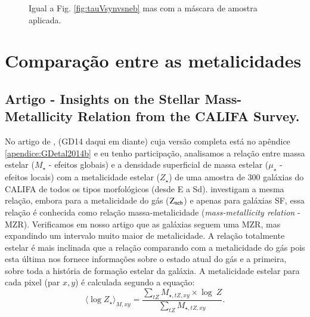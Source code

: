 \begin{figure}
	\centering
	\caption[Comparação entre os coeficientes de extinção (com máscara).]
	{Igual a Fig. \ref{fig:tauVsynvsneb} mas com a máscara de amostra aplicada.} 
	\label{fig:tauVsynvsnebMask}
\end{figure}


\section{Comparação entre as metalicidades}
\label{sec:synvsneb:Z}

\subsection{Artigo - Insights on the Stellar Mass-Metallicity Relation from the CALIFA Survey.}

No artigo de \citet{GonzalezDelgado.etal.2014b}, (GD14 daqui em diante) cuja versão completa está no
apêndice \ref{apendice:GDetal2014b} e eu tenho participação, analisamos a relação entre massa
estelar ($M_\star$ - efeitos globais) e a densidade superficial de massa estelar ($\mu_\star$ -
efeitos locais) com a metalicidade estelar ($Z_\star$) de uma amostra de 300 galáxias do CALIFA de
todos os tipos morfológicos (desde E a Sd). \citet{Tremonti.etal.2004a} investigam a mesma relação,
embora para a metalicidade do gás ($\mathrm{Z}_{\mathrm{neb}}$) e apenas para galáxias SF, essa relação é conhecida como
relação massa-metalicidade ({\em mass-metallicity relation} - MZR). Verificamos em nosso artigo que
as galáxias seguem uma MZR, mas expandindo um intervalo muito maior de metalicidade. A relação
totalmente estelar é mais inclinada que a relação comparando com a metalicidade do gás pois esta
última nos fornece informações sobre o estado atual do gás e a primeira, sobre toda a história de
formação estelar da galáxia. A metalicidade estelar para cada pixel (par $x,y$) é calculada segundo
a equação:
\begin{equation}
 	\label{eq:logZmass}
 	\langle \log Z_\star \rangle_{M,xy} = 
	\frac{ \sum_{tZ} M_{\star,tZ,xy} \times \log\ Z}{
	\sum_{tZ} M_{\star,tZ,xy} }.
\end{equation}


